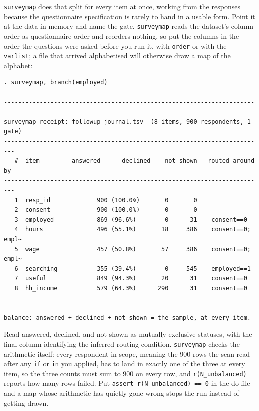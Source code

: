 \documentclass[
    a4paper,
    fontsize=10pt,
    twoside=true,
    numbers=noenddot,
]{kaobook}
\begin{document}
\texttt{surveymap} does that split for every item at once, working from the responses because the questionnaire specification is rarely to hand in a usable form. Point it at the data in memory and name the gate. \texttt{surveymap} reads the dataset's column order as questionnaire order and reorders nothing, so put the columns in the order the questions were asked before you run it, with \texttt{order} or with the \texttt{varlist}; a file that arrived alphabetised will otherwise draw a map of the alphabet:
\par
{\footnotesize
\begin{verbatim}
. surveymap, branch(employed)

-------------------------------------------------------------------------
surveymap receipt: followup_journal.tsv  (8 items, 900 respondents, 1 gate)
-------------------------------------------------------------------------
   #  item         answered      declined    not shown   routed around by
-------------------------------------------------------------------------
   1  resp_id             900 (100.0%)       0       0
   2  consent             900 (100.0%)       0       0
   3  employed            869 (96.6%)        0      31    consent==0
   4  hours               496 (55.1%)       18     386    consent==0; empl~
   5  wage                457 (50.8%)       57     386    consent==0; empl~
   6  searching           355 (39.4%)        0     545    employed==1
   7  useful              849 (94.3%)       20      31    consent==0
   8  hh_income           579 (64.3%)      290      31    consent==0
-------------------------------------------------------------------------
balance: answered + declined + not shown = the sample, at every item.
\end{verbatim}
}
Read answered, declined, and not shown as mutually exclusive statuses, with the final column identifying the inferred routing condition. \texttt{surveymap} checks the arithmetic itself: every respondent in scope, meaning the 900 rows the scan read after any \texttt{if} or \texttt{in} you applied, has to land in exactly one of the three at every item, so the three counts must sum to 900 on every row, and \texttt{r(N\_unbalanced)} reports how many rows failed. Put \texttt{assert r(N\_unbalanced) == 0} in the do-file and a map whose arithmetic has quietly gone wrong stops the run instead of getting drawn.
\end{document}
